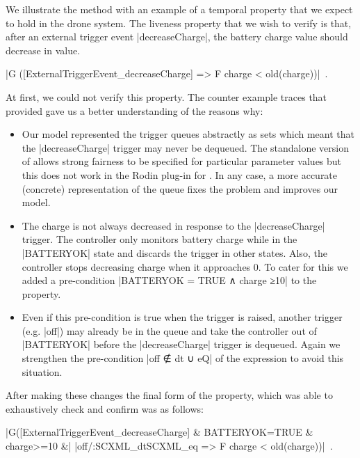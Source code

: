 We illustrate the method with an example of a temporal property that we expect to hold in the drone \SCXML system. 
The liveness property that we wish to  verify is that, after an external trigger event |decreaseCharge|, the battery charge value should  decrease in value.
\begin{center}
  |G ([ExternalTriggerEvent_decreaseCharge] => F {charge < old(charge)})|~.
\end{center}
At first, we could not verify this property.
The counter example traces that \PROB provided gave us a better understanding of the reasons why:
\begin{itemize}
\item
Our model represented the trigger queues abstractly as sets which meant that the |decreaseCharge| trigger may never be dequeued.
The standalone version of \PROB allows strong fairness to be specified for particular parameter values but this does not work in the Rodin plug-in for \PROB. 
In any case, a more accurate (concrete) representation of the queue fixes the problem and improves our model.
\item 
The charge is not always decreased in response to the |decreaseCharge| trigger.
The controller only monitors battery charge while in the |BATTERYOK| state and discards the trigger in other states.
Also, the controller stops decreasing charge when it approaches 0. 
To cater for this we added a pre-condition |BATTERYOK = TRUE ∧ charge ≥10| to the \LTL property.
\item
Even if this pre-condition is true when the trigger is raised, another trigger (e.g. |off|) may already be in the queue and take the controller out of |BATTERYOK| before the |decreaseCharge| trigger is dequeued.
Again we strengthen the pre-condition |off ∉ dt ∪ eQ| of the \LTL expression to avoid this situation.
\end{itemize}
After making these changes the final form of the \LTL property, which \PROB was able to exhaustively check and confirm was as follows:
\begin{center}
	|G([ExternalTriggerEvent_decreaseCharge] & {BATTERYOK=TRUE & charge>=10 &|
		|off/:SCXML_dt\/SCXML_eq} => F {charge < old(charge)})|~.
\end{center}



